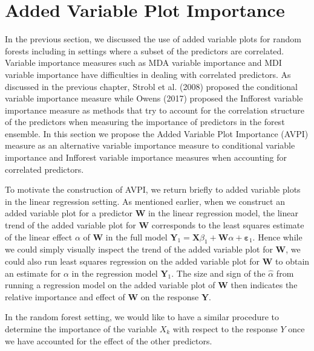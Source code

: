 \documentclass[12pt,twoside]{reedthesis}
\theoremstyle{definition}
\theoremstyle{definition}
\theoremstyle{definition}
\theoremstyle{remark}
\begin{document}
\section{Added Variable Plot
Importance}\label{added-variable-plot-importance-1}

In the previous section, we discussed the use of added variable plots
for random forests including in settings where a subset of the
predictors are correlated. Variable importance measures such as MDA
variable importance and MDI variable importance have difficulties in
dealing with correlated predictors. As discussed in the previous
chapter, Strobl et al. (2008) proposed the conditional variable
importance measure while Owens (2017) proposed the Infforest variable
importance measure as methods that try to account for the correlation
structure of the predictors when measuring the importance of predictors
in the forest ensemble. In this section we propose the Added Variable
Plot Importance (AVPI) measure as an alternative variable importance
measure to conditional variable importance and Infforest variable
importance measures when accounting for correlated predictors. \par

To motivate the construction of AVPI, we return briefly to added
variable plots in the linear regression setting. As mentioned earlier,
when we construct an added variable plot for a predictor \(\mathbf{W}\)
in the linear regression model, the linear trend of the added variable
plot for \(\mathbf{W}\) corresponds to the least squares estimate of the
linear effect \(\alpha\) of \(\mathbf{W}\) in the full model
\(\mathbf{Y}_1=\mathbf{X}\beta_1+\mathbf{W}\alpha+\mathbf{\varepsilon}_1\).
Hence while we could simply visually inspect the trend of the added
variable plot for \(\mathbf{W}\), we could also run least squares
regression on the added variable plot for \(\mathbf{W}\) to obtain an
estimate for \(\alpha\) in the regression model \(\mathbf{Y}_1\). The
size and sign of the \(\hat{\alpha}\) from running a regression model on
the added variable plot of \(\mathbf{W}\) then indicates the relative
importance and effect of \(\mathbf{W}\) on the response \(\mathbf{Y}\).
\par

In the random forest setting, we would like to have a similar procedure
to determine the importance of the variable \(X_k\) with respect to the
response \(Y\) once we have accounted for the effect of the other
predictors. \par 
\end{document}

